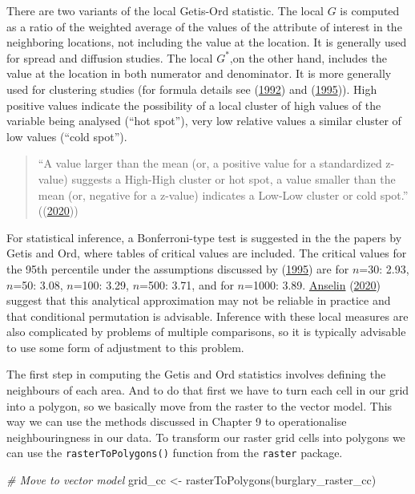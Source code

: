 \documentclass[
  krantz2]{krantz}
\makeatletter
\newenvironment{Shaded}{\begin{snugshade}}{\end{snugshade}}
\newcommand{\CommentTok}[1]{\textcolor[rgb]{0.37,0.37,0.37}{\textit{#1}}}
\newcommand{\FunctionTok}[1]{\textcolor[rgb]{0,0,0}{#1}}
\newcommand{\NormalTok}[1]{#1}
\newcommand{\OtherTok}[1]{\textcolor[rgb]{0.37,0.37,0.37}{#1}}
\newenvironment{kframe}{%
\medskip{}
\setlength{\fboxsep}{.8em}
 \def\at@end@of@kframe{}%
 \ifinner\ifhmode%
  \def\at@end@of@kframe{\end{minipage}}%
  \begin{minipage}{\columnwidth}%
 \fi\fi%
 \def\FrameCommand##1{\hskip\@totalleftmargin \hskip-\fboxsep
 \colorbox{shadecolor}{##1}\hskip-\fboxsep
     \hskip-\linewidth \hskip-\@totalleftmargin \hskip\columnwidth}%
 \MakeFramed {\advance\hsize-\width
   \@totalleftmargin\z@ \linewidth\hsize
   \@setminipage}}%
 {\par\unskip\endMakeFramed%
 \at@end@of@kframe}
\renewenvironment{Shaded}{\begin{kframe}}{\end{kframe}}
\makeatother
\begin{document}
There are two variants of the local Getis-Ord statistic. The local \(G\) is computed as a ratio of the weighted average of the values of the attribute of interest in the neighboring locations, not including the value at the location. It is generally used for spread and diffusion studies. The local \(G^*\),on the other hand, includes the value at the location in both numerator and denominator. It is more generally used for clustering studies (for formula details see (\protect\hyperlink{ref-Getis_1992}{1992}) and (\protect\hyperlink{ref-Ord_1995}{1995})). High positive values indicate the possibility of a local cluster of high values of the variable being analysed (``hot spot''), very low relative values a similar cluster of low values (``cold spot'').

\begin{quote}
``A value larger than the mean (or, a positive value for a standardized z-value) suggests a High-High cluster or hot spot, a value smaller than the mean (or, negative for a z-value) indicates a Low-Low cluster or cold spot.'' ((\protect\hyperlink{ref-Anselin_2020a}{2020}))
\end{quote}

For statistical inference, a Bonferroni-type test is suggested in the the papers by Getis and Ord, where tables of critical values are included. The critical values for the 95th percentile under the assumptions discussed by (\protect\hyperlink{ref-Ord_1995}{1995}) are for \(n\)=30: 2.93, \(n\)=50: 3.08, \(n\)=100: 3.29, \(n\)=500: 3.71, and for \(n\)=1000: 3.89. \protect\hyperlink{ref-Anselin_2020a}{Anselin} (\protect\hyperlink{ref-Anselin_2020a}{2020}) suggest that this analytical approximation may not be reliable in practice and that conditional permutation is advisable. Inference with these local measures are also complicated by problems of multiple comparisons, so it is typically advisable to use some form of adjustment to this problem.

The first step in computing the Getis and Ord statistics involves defining the neighbours of each area. And to do that first we have to turn each cell in our grid into a polygon, so we basically move from the raster to the vector model. This way we can use the methods discussed in Chapter 9 to operationalise neighbouringness in our data. To transform our raster grid cells into polygons we can use the \texttt{rasterToPolygons()} function from the \texttt{raster} package.

\begin{Shaded}
\begin{Highlighting}[]
\CommentTok{\# Move to vector model}
\NormalTok{grid\_cc }\OtherTok{\textless{}{-}}  \FunctionTok{rasterToPolygons}\NormalTok{(burglary\_raster\_cc)}
\end{Highlighting}
\end{Shaded}
\end{document}
